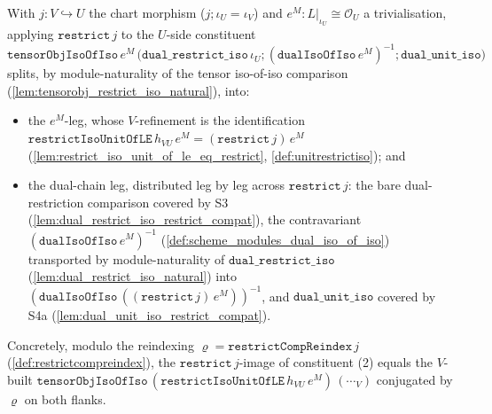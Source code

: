 \begin{lemma}

  \label{lem:trivialisation_restrict_em_split}
  With \(j : V \hookrightarrow U\) the chart morphism (\(j \mathbin{;} \iota_U = \iota_V\)) and
  \(e^M : L|_{\iota_U} \cong \mathcal{O}_U\) a trivialisation, applying \(\mathtt{restrict}\,j\) to the
  \(U\)-side constituent
  \(\mathtt{tensorObjIsoOfIso}\,e^M\,\bigl(\mathtt{dual\_restrict\_iso}\,\iota_U \mathbin{;}
  (\mathtt{dualIsoOfIso}\,e^M)^{-1} \mathbin{;} \mathtt{dual\_unit\_iso}\bigr)\) splits, by
  module-naturality of the tensor iso-of-iso comparison
  (\cref{lem:tensorobj_restrict_iso_natural}), into:
  \begin{itemize}
    \item the \(e^M\)-leg, whose \(V\)-refinement is the identification
      \(\mathtt{restrictIsoUnitOfLE}\,h_{VU}\,e^M = (\mathtt{restrict}\,j)\,e^M\)
      (\cref{lem:restrict_iso_unit_of_le_eq_restrict}, \cref{def:unitrestrictiso}); and
    \item the dual-chain leg, distributed leg by leg across \(\mathtt{restrict}\,j\): the bare
      dual-restriction comparison covered by S3 (\cref{lem:dual_restrict_iso_restrict_compat}), the
      contravariant \((\mathtt{dualIsoOfIso}\,e^M)^{-1}\) (\cref{def:scheme_modules_dual_iso_of_iso})
      transported by module-naturality of \(\mathtt{dual\_restrict\_iso}\)
      (\cref{lem:dual_restrict_iso_natural}) into \((\mathtt{dualIsoOfIso}\,((\mathtt{restrict}\,j)\,e^M))^{-1}\),
      and \(\mathtt{dual\_unit\_iso}\) covered by S4a (\cref{lem:dual_unit_iso_restrict_compat}).
  \end{itemize}
  Concretely, modulo the reindexing \(\varrho = \mathtt{restrictCompReindex}\,j\)
  (\cref{def:restrictcompreindex}), the \(\mathtt{restrict}\,j\)-image of constituent (2) equals the
  \(V\)-built \(\mathtt{tensorObjIsoOfIso}\,(\mathtt{restrictIsoUnitOfLE}\,h_{VU}\,e^M)\,(\cdots_V)\)
  conjugated by \(\varrho\) on both flanks.
\end{lemma}
